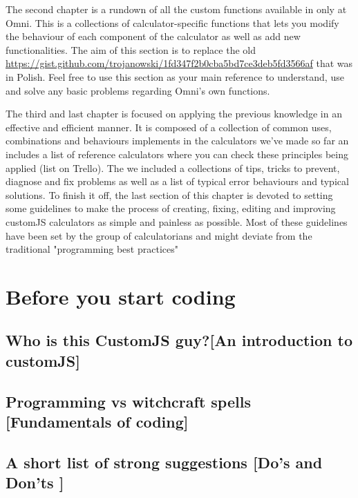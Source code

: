 \documentclass[11pt,a4paper,oldfontcommands]{memoir}
\begin{document}
The second chapter is a rundown of all the custom functions available in only at Omni. This is a collections of calculator-specific functions that lets you modify the behaviour of each component of the calculator as well as add new functionalities. The aim of this section is to replace the old \href{gist}{https://gist.github.com/trojanowski/1fd347f2b0cba5bd7ce3deb5fd3566af} that was in Polish. Feel free to use this section as your main reference to understand, use and solve any basic problems regarding Omni's own functions. 

The third and last chapter is focused on applying the previous knowledge in an effective and efficient manner. It is composed of a collection of common uses, combinations and behaviours implements in the calculators we've made so far an includes a list of reference calculators where you can check these principles being applied (list on Trello). The we included a collections of tips, tricks to prevent, diagnose and fix problems as well as a list of typical error behaviours and typical solutions. To finish it off, the last section of this chapter is devoted to setting some guidelines to make the process of creating, fixing, editing and improving customJS calculators as simple and painless as possible. Most of these guidelines have been set by the group of calculatorians and might deviate from the traditional "programming best practices"

\chapter{Before you start coding}
    \label{chap:b4}
    
    \section{Who is this CustomJS guy?\small[An introduction to customJS]}
        \label{sec:whatis}
        
    
    
    
    \section{Programming vs witchcraft spells \small[Fundamentals of coding]}    
        \label{sec:fundamentals}
        
    
    \section{A short list of strong suggestions \small{[Do's and Don'ts ]}}
        \label{sec:suggestions}
        
\end{document}
